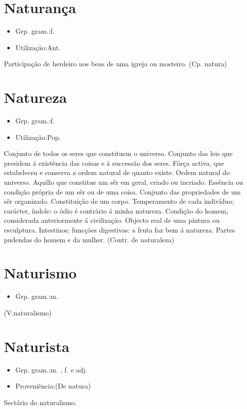 \section{Naturança}
\begin{itemize}
\item {Grp. gram.:f.}
\end{itemize}
\begin{itemize}
\item {Utilização:Ant.}
\end{itemize}
Participação de herdeiro nos bens de uma igreja ou mosteiro.
(Cp. \textunderscore natura\textunderscore )
\section{Natureza}
\begin{itemize}
\item {Grp. gram.:f.}
\end{itemize}
\begin{itemize}
\item {Utilização:Pop.}
\end{itemize}
Conjunto de todos os seres que constituem o universo.
Conjunto das leis que presidem á existência das coisas e á successão dos seres.
Fôrça activa, que estabeleceu e conserva a ordem natural de quanto existe.
Ordem natural do universo.
Aquillo que constitue um sêr em geral, criado ou incriado.
Essência ou condição própria de um sêr ou de uma coisa.
Conjunto das propriedades de um sêr organizado.
Constituição de um corpo.
Temperamento de cada indivíduo; carácter, índole: \textunderscore o ódio é contrário á minha natureza\textunderscore .
Condição do homem, considerada anteriormente á civilização.
Objecto real de uma pintura ou esculptura.
Intestinos; funcções digestivas: \textunderscore a fruta faz bem á natureza\textunderscore .
Partes pudendas do homem e da mulher.
(Contr. de \textunderscore naturaleza\textunderscore )
\section{Naturismo}
\begin{itemize}
\item {Grp. gram.:m.}
\end{itemize}
(V.naturalismo)
\section{Naturista}
\begin{itemize}
\item {Grp. gram.:m. ,  f.  e  adj.}
\end{itemize}
\begin{itemize}
\item {Proveniência:(De \textunderscore natura\textunderscore )}
\end{itemize}
Sectário do naturalismo.
